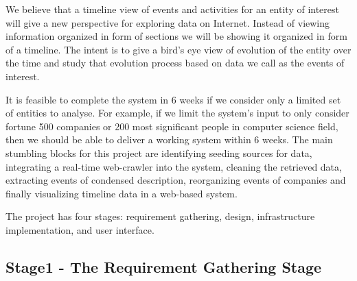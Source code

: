 \documentclass[10pt,conference]{IEEEtran}
\begin{document}
We believe that a timeline view of events and activities for an entity of
interest will give a new perspective for exploring data on Internet. Instead of
viewing information organized in form of sections we will be showing it
organized in form of a timeline. The intent is to give a bird's eye view of
evolution of the entity over the time and study that evolution process based on
data we call as the events of interest.

It is feasible to complete the system in 6 weeks if we consider only a limited
set of entities to analyse. For example, if we limit the system's input to only
consider fortune 500 companies or 200 most significant people in computer
science field, then we should be able to deliver a working system within 6
weeks. The main stumbling blocks for this project are identifying seeding
sources for data, integrating a real-time web-crawler into the system, cleaning
the retrieved data, extracting events of condensed description, reorganizing
events of companies and finally visualizing timeline data in a web-based
system.

The project has four stages: requirement gathering, design, infrastructure
implementation, and user interface.

\subsection{Stage1 - The Requirement Gathering Stage}
\label{sec:requirement-gathering-stage}


%

%

%

%




\nocite{*}
\end{document}

